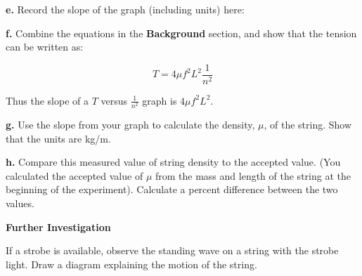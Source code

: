 \textbf{e. } Record the slope of the graph (including units) here:

\vspace{20mm}

\textbf{f. } Combine the equations in the \textbf{Background } section, and show that the tension can be written as:

\begin{equation}
T=4\mu f^{2}L^{2}\frac{1}{n^2}
\end{equation}

\vspace{25mm}

Thus the slope of a $T$ versus $\frac{1}{n^2}$ graph is $4\mu f^{2}L^{2}$.

\textbf{g. } Use the slope from your graph to calculate the density, $\mu $, of the string. Show that the units are kg/m.

\vspace{5cm}

\textbf{h. } Compare this measured value of string density to the accepted value. (You calculated the accepted value of $\mu $ from the mass and length of the string at the beginning of the experiment). Calculate a percent difference between the two values.

\vspace{50mm}




\textbf{Further Investigation}







If a strobe is available, observe the standing wave on a string with the 
strobe light. Draw a diagram explaining the motion of the string.




